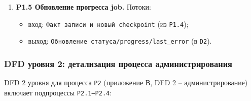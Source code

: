 ﻿\documentclass[14pt,a4paper]{extarticle}
\begin{document}
\begin{enumerate}
\begin{itemize}
    \item выход: \texttt{Upsert blocks/transactions/inputs/outputs/utxo} (в \texttt{D1}), \texttt{Факт записи и новый checkpoint} (в \texttt{P1.5}).
  \end{itemize}
  \item \textbf{P1.5 Обновление прогресса job.}
  Потоки:
  \begin{itemize}
    \item вход: \texttt{Факт записи и новый checkpoint} (из \texttt{P1.4});
    \item выход: \texttt{Обновление статуса/progress/last\_error} (в \texttt{D2}).
  \end{itemize}
\end{enumerate}

\subsubsection{DFD уровня 2: детализация процесса администрирования}
\noindent DFD 2 уровня для процесса \texttt{P2} (приложение В, DFD 2 -- администрирование) включает подпроцессы \texttt{P2.1--P2.4}:
\end{document}
